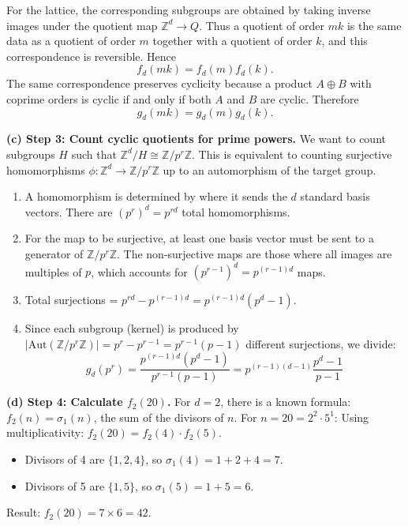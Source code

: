\begin{solution}
For the lattice, the corresponding subgroups are obtained by taking inverse images under the quotient map $\mathbb{Z}^d\to Q$. Thus a quotient of order $mk$ is the same data as a quotient of order $m$ together with a quotient of order $k$, and this correspondence is reversible. Hence
\[
f_d(mk)=f_d(m)f_d(k).
\]
The same correspondence preserves cyclicity because a product $A\oplus B$ with coprime orders is cyclic if and only if both $A$ and $B$ are cyclic. Therefore
\[
g_d(mk)=g_d(m)g_d(k).
\]

\textbf{(c) Step 3: Count cyclic quotients for prime powers.}
We want to count subgroups $H$ such that $\mathbb{Z}^d / H \cong \mathbb{Z}/p^r\mathbb{Z}$.
This is equivalent to counting surjective homomorphisms $\phi: \mathbb{Z}^d \to \mathbb{Z}/p^r\mathbb{Z}$ up to an automorphism of the target group.
\begin{enumerate}
    \item A homomorphism is determined by where it sends the $d$ standard basis vectors. There are $(p^r)^d = p^{rd}$ total homomorphisms.
    \item For the map to be surjective, at least one basis vector must be sent to a generator of $\mathbb{Z}/p^r\mathbb{Z}$. The non-surjective maps are those where all images are multiples of $p$, which accounts for $(p^{r-1})^d = p^{(r-1)d}$ maps.
    \item Total surjections = $p^{rd} - p^{(r-1)d} = p^{(r-1)d}(p^d - 1)$.
    \item Since each subgroup (kernel) is produced by $|\text{Aut}(\mathbb{Z}/p^r\mathbb{Z})| = p^r - p^{r-1} = p^{r-1}(p-1)$ different surjections, we divide:
    \[ g_d(p^r) = \frac{p^{(r-1)d}(p^d - 1)}{p^{r-1}(p-1)} = p^{(r-1)(d-1)} \frac{p^d - 1}{p - 1} \]
\end{enumerate}

\textbf{(d) Step 4: Calculate $f_2(20)$.}
For $d=2$, there is a known formula: $f_2(n) = \sigma_1(n)$, the sum of the divisors of $n$.
For $n = 20 = 2^2 \cdot 5^1$:
Using multiplicativity: $f_2(20) = f_2(4) \cdot f_2(5)$.
\begin{itemize}
    \item Divisors of 4 are $\{1, 2, 4\}$, so $\sigma_1(4) = 1+2+4 = 7$.
    \item Divisors of 5 are $\{1, 5\}$, so $\sigma_1(5) = 1+5 = 6$.
\end{itemize}
Result: $f_2(20) = 7 \times 6 = 42$.
\end{solution}


